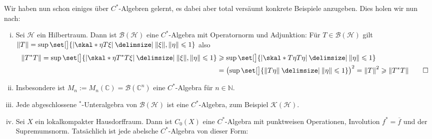 \begin{beispiel}[{name=[für C*-Algebren]}]
	Wir haben nun schon einiges über $C^*$-Algebren gelernt, es dabei aber total versäumt konkrete Beispiele anzugeben. Dies holen wir nun nach:
	\begin{enumerate}[(i)]
		\item Sei $\mathcal{H}$ ein Hilbertraum. Dann ist $\mathcal{B}(\mathcal{H})$ eine $C^*$-Algebra mit Operatornorm und Adjunktion: Für $T \in \mathcal{B}(\mathcal{H})$ gilt
		\(
			\norm*{T} = \sup \set[\big]{\abs*{\skal*{\eta}{T \xi}} \given \norm*{\xi}, \norm*{\eta} \le 1}
		\)
		also
		\begin{align}
			\norm*{T^* T} = \sup \set[\big]{\abs*{\skal*{\eta}{T^* T \xi}} \given \norm*{\xi}, \norm*{\eta} \le 1} &\ge \sup \set[\big]{ \abs*{\skal*{T \eta}{T \eta}} \given 
			\norm*{\eta} \le 1}\\
			&= \enbrace*{\sup \set[\big]{\norm*{T \eta} \given \norm*{\eta} \le 1}}^2 = \norm*{T}^2 \ge \norm*{T^*T} \qedhere
		\end{align}
		\item Insbesondere ist $M_n := M_n(\mathbb{C}) = \mathcal{B}(\mathbb{C}^n)$ eine $C^*$-Algebra für $n \in \mathbb{N}$.
		\item Jede abgeschlossene ${}^*$-Unteralgebra von $\mathcal{B}(\mathcal{H})$ ist eine $C^*$-Algebra, zum Beispiel $\mathcal{K}(\mathcal{H})$.
		\item Sei $X$ ein lokalkompakter Hausdorffraum. Dann ist $C_0(X)$ eine $C^*$-Algebra mit punktweisen Operationen, Involution $f^*= \overline{f}$ und der Supremumsnorm.
		Tatsächlich ist jede abelsche $C^*$-Algebra von dieser Form: 
	\end{enumerate}
\end{beispiel}

